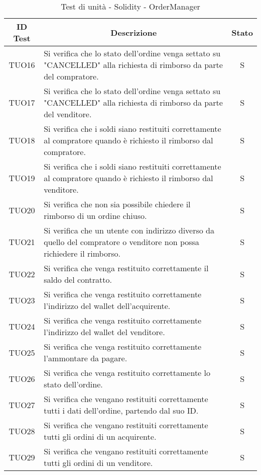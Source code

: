 \begin{table}[H]
  \centering
  \renewcommand{\arraystretch}{1.8}
  \begin{tabular}{c|p{10cm}|c}
    \rowcolor[HTML]{125E28}
    \color[HTML]{FFFFFF}\textbf{ID Test}
          & \multicolumn{1}{c}{\color[HTML]{FFFFFF}\textbf{Descrizione}}
          & \color[HTML]{FFFFFF}\textbf{Stato}                                                                                         \\
    \hline
    TUO16 & Si verifica che lo stato dell'ordine venga settato su "CANCELLED" alla richiesta di rimborso da parte del compratore.  & S \\
    TUO17 & Si verifica che lo stato dell'ordine venga settato su "CANCELLED" alla richiesta di rimborso da parte del venditore.   & S \\
    TUO18 & Si verifica che i soldi siano restituiti correttamente al compratore quando è richiesto il rimborso dal compratore.    & S \\
    TUO19 & Si verifica che i soldi siano restituiti correttamente al compratore quando è richiesto il rimborso dal venditore.     & S \\
    TUO20 & Si verifica che non sia possibile chiedere il rimborso di un ordine chiuso.                                            & S \\
    TUO21 & Si verifica che un utente con indirizzo diverso da quello del compratore o venditore non possa richiedere il rimborso. & S \\
    TUO22 & Si verifica che venga restituito correttamente il saldo del contratto.                                                 & S \\
    TUO23 & Si verifica che venga restituito correttamente l'indirizzo del wallet\glo{} dell'acquirente.                           & S \\
    TUO24 & Si verifica che venga restituito correttamente l'indirizzo del wallet\glo{} del venditore.                             & S \\
    TUO25 & Si verifica che venga restituito correttamente l'ammontare da pagare.                                                  & S \\
    TUO26 & Si verifica che venga restituito correttamente lo stato dell'ordine.                                                   & S \\
    TUO27 & Si verifica che vengano restituiti correttamente tutti i dati dell'ordine, partendo dal suo ID.                        & S \\
    TUO28 & Si verifica che vengano restituiti correttamente tutti gli ordini di un acquirente.                                    & S \\
    TUO29 & Si verifica che vengano restituiti correttamente tutti gli ordini di un venditore.                                     & S \\
  \end{tabular}
  \caption{Test di unità - Solidity - OrderManager}
\end{table}

